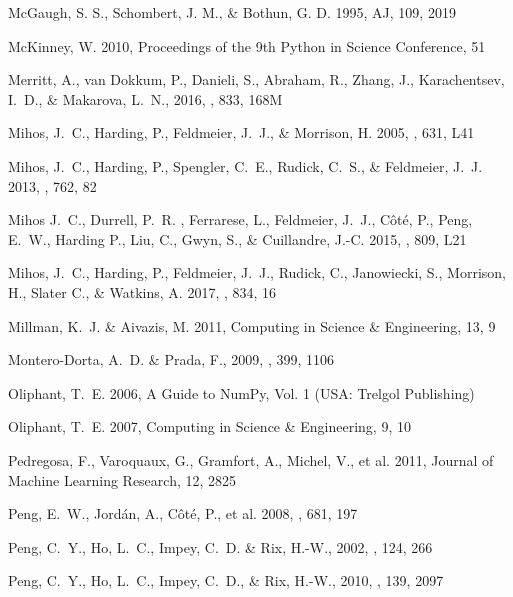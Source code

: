 \documentclass[twocolumn,tighten]{aastex63}
\begin{document}
\begin{thebibliography}{}
McGaugh, S. S., Schombert, J. M., \& Bothun, G. D. 1995, AJ, 109, 2019

McKinney, W. 2010, Proceedings of the 9th Python in Science Conference, 51 

Merritt, A., van Dokkum, P., Danieli, S., Abraham, R., Zhang, J., Karachentsev, I.~D., \& Makarova, L.~N., 2016, \apj, 833, 168M

Mihos, J.~C., Harding, P., Feldmeier, J.~J., \& Morrison, H. 2005, \apjl, 631, L41

Mihos, J.~C., Harding, P., Spengler, C.~E., Rudick, C.~S., \& Feldmeier, J.~J. 2013, \apj, 762, 82

Mihos J.~C., Durrell, P.~R. , Ferrarese, L., Feldmeier, J.~J., C\^{o}t\'{e}, P., Peng, E.~W., Harding P., Liu, C., Gwyn, S., \& Cuillandre, J.-C. 2015, \apjl, 809, L21

Mihos, J.~C., Harding, P., Feldmeier, J.~J., Rudick, C., Janowiecki, S., Morrison, H., Slater C., \& Watkins, A. 2017, \apj, 834, 16

Millman, K.~J. \& Aivazis, M. 2011, Computing in Science \& Engineering, 13, 9

Montero-Dorta, A.~D. \& Prada, F., 2009, \mnras, 399, 1106

Oliphant, T.~E. 2006, A Guide to NumPy, Vol. 1 (USA: Trelgol Publishing)

Oliphant, T.~E. 2007, Computing in Science \& Engineering, 9, 10


Pedregosa, F., Varoquaux, G., Gramfort, A.,  Michel, V., et al. 2011, Journal of Machine Learning Research, 12, 2825

Peng, E.~W., Jord\'{a}n, A., C\^{o}t\'{e}, P., et al. 2008, \apj, 681, 197

Peng, C.~Y., Ho, L.~C., Impey, C.~D. \& Rix, H.-W., 2002, \aj, 124, 266

Peng, C.~Y., Ho, L.~C., Impey, C.~D., \& Rix, H.-W., 2010, \aj, 139, 2097


\end{thebibliography}
\end{document}

